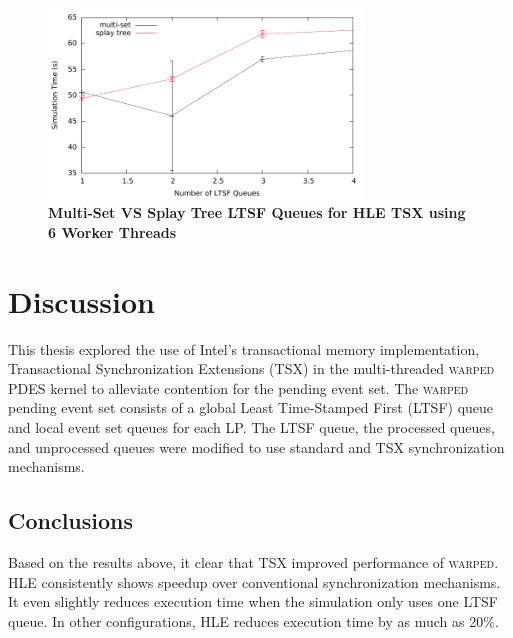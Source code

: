 \documentclass[11pt]{book}
\begin{document}
\begin{figure}[H]
    \centering
    \graphicspath{ {./figures/} }
    \includegraphics[width=0.75\textwidth,keepaspectratio]{hugeepidemicsim-NOmig-timeVSschedQs-msVSst-6thread-hle}
\caption{\textbf{Multi-Set VS Splay Tree LTSF Queues for HLE TSX using 6 Worker Threads}}
    \label{fig:noThrMig_timeVSschq_6threads_msVSst_hle}
\end{figure}


\chapter{Discussion}

This thesis explored the use of Intel's transactional memory implementation,
Transactional Synchronization Extensions (TSX) in the multi-threaded
\textsc{warped} PDES kernel to alleviate contention for the pending event set.
The \textsc{warped} pending event set consists of a global Least Time-Stamped
First (LTSF) queue and local event set queues for each LP.  The LTSF queue, the
processed queues, and unprocessed queues were modified to use standard and TSX
synchronization mechanisms. 

\section{Conclusions}

Based on the results above, it clear that TSX improved performance of
\textsc{warped}.  HLE consistently shows speedup over conventional
synchronization mechanisms.  It even slightly reduces execution time when the
simulation only uses one LTSF queue.  In other configurations, HLE reduces
execution time by as much as 20\%. 
\end{document}

